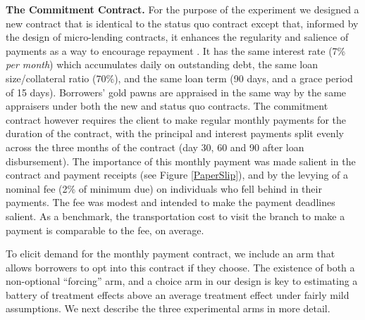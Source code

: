 \documentclass[ecta,nameyear,final]{econsocart}
\begin{document}
\noindent \textbf{The Commitment Contract.} For the purpose of the experiment we designed a new contract that is identical to the status quo contract except that, informed by the design of micro-lending contracts, it enhances the regularity and salience of payments as a way to encourage repayment \citep{morduch1999microfinance, bauer2012behavioral}.  It has the same interest rate (7\% \textit{per month}) which accumulates daily on outstanding debt, the same loan size/collateral ratio (70\%), and the same loan term (90 days, and a grace period of 15 days). Borrowers' gold pawns are appraised in the same way by the same appraisers under both the new and status quo contracts. The commitment contract however requires the client to make regular monthly payments for the duration of the contract, with the principal and interest payments split evenly across the three months of the contract (day 30, 60 and 90 after loan disbursement). The importance of this monthly payment was made salient in the contract and payment receipts (see Figure \ref{PaperSlip}), and by the levying of a nominal fee (2\% of minimum due) on individuals who fell behind in their payments. %
The fee was modest and intended to make the payment deadlines salient. As a benchmark, the transportation cost to visit the branch to make a payment is comparable to the fee, on average.

To elicit demand for the monthly payment contract, we include an arm that allows borrowers to opt into this contract if they choose. The existence of both a non-optional ``forcing'' arm, and a choice arm in our design is key to estimating a battery of treatment effects above an average treatment effect under fairly mild assumptions. We next describe the three experimental arms in more detail. 
\end{document}
